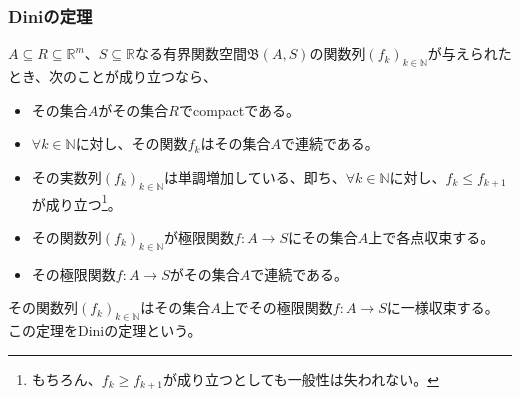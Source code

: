 \documentclass[dvipdfmx]{jsarticle}
\begin{document}
\subsubsection{Diniの定理}%
\begin{thm}[Diniの定理]\label{4.1.11.19}
$A \subseteq R \subseteq \mathbb{R}^{m}$、$S \subseteq \mathbb{R}$なる有界関数空間$\mathfrak{B}(A,S)$の関数列$\left( f_{k} \right)_{k \in \mathbb{N}}$が与えられたとき、次のことが成り立つなら、
\begin{itemize}
\item
  その集合$A$がその集合$R$でcompactである。
\item
  $\forall k \in \mathbb{N}$に対し、その関数$f_{k}$はその集合$A$で連続である。
\item
  その実数列$\left( f_{k} \right)_{k \in \mathbb{N}}$は単調増加している、即ち、$\forall k \in \mathbb{N}$に対し、$f_{k} \leq f_{k + 1}$が成り立つ\footnote{もちろん、$f_{k} \geq f_{k + 1}$が成り立つとしても一般性は失われない。}。
\item
  その関数列$\left( f_{k} \right)_{k \in \mathbb{N}}$が極限関数$f:A \rightarrow S$にその集合$A$上で各点収束する。
\item
  その極限関数$f:A \rightarrow S$がその集合$A$で連続である。
\end{itemize}
その関数列$\left( f_{k} \right)_{k \in \mathbb{N}}$はその集合$A$上でその極限関数$f:A \rightarrow S$に一様収束する。この定理をDiniの定理という。
\end{thm}
\end{document}
